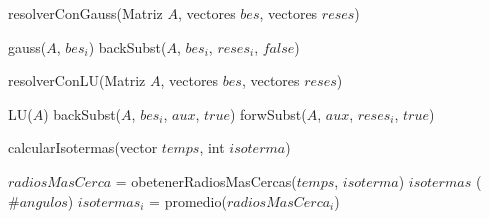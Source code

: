 \begin{algorithm}[H]
\caption{resolverConGauss(Matriz $A$, vectores $bes$, vectores $reses$)}
\label{pseudo:resGauss}
\begin{algorithmic}
	\STATE gauss($A$, $bes_{i}$)
	\STATE backSubst($A$, $bes_{i}$, $reses_{i}$, $false$)
\ENDFOR

\end{algorithmic}
\end{algorithm}

\begin{algorithm}[H]
\caption{resolverConLU(Matriz $A$, vectores $bes$, vectores $reses$)}
\label{pseudo:resLU}
\begin{algorithmic}
\STATE LU($A$)
	\STATE backSubst($A$, $bes_{i}$, $aux$, $true$)
	\STATE forwSubst($A$, $aux$, $reses_{i}$, $true$)
\ENDFOR


\end{algorithmic}
\end{algorithm}

\begin{algorithm}[H]
\caption{calcularIsotermas(vector $temps$, int $isoterma$)}
\label{pseudo:calcuIsot}
\begin{algorithmic}
\STATE $radiosMasCerca$ = obetenerRadiosMasCercas($temps$, $isoterma$)
\STATE $isotermas$ ($\#angulos$)
	\STATE $isotermas_i$ = promedio($radiosMasCerca_i$)
\ENDFOR
\end{algorithmic}
\end{algorithm}

